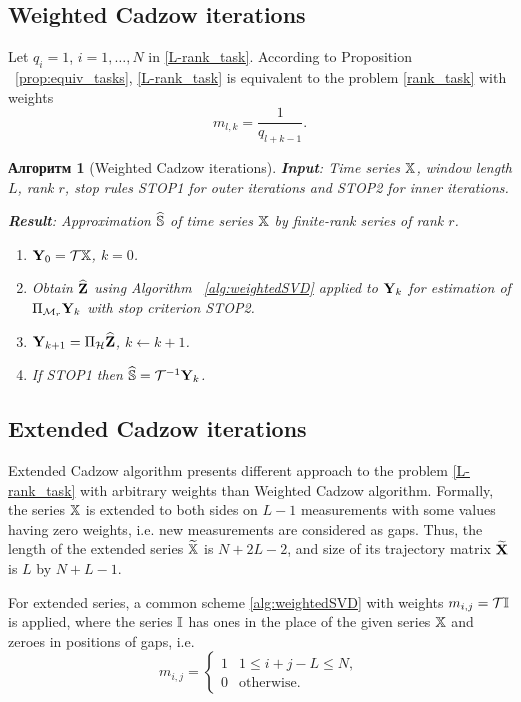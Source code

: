\documentclass[12pt,a4paper,fleqn,leqno]{article}
\newtheorem{algorithm}{Алгоритм}
\begin{document}
\subsection{Weighted Cadzow iterations}

Let $q_{i}=1$, $i = 1, \ldots, N$ in \eqref{L-rank_task}. According to Proposition ~\ref{prop:equiv_tasks},  \eqref{L-rank_task} is equivalent to the problem \eqref{rank_task} with weights
\begin{equation}
\label{Mw}
   m_{l, k} = \frac{1}{q_{l + k - 1}}.
\end{equation}

\begin{algorithm}[Weighted Cadzow iterations]\label{alg:WCIt}
\textbf{Input}: Time series $\mathbb{X}$, window length $L$, rank $r$,
stop rules STOP1 for outer iterations and STOP2 for inner iterations.

\textbf{Result}:
Approximation $\widehat{\mathbb{S}}$ of time series $\mathbb{X}$ by finite-rank series of rank $r$.

\begin{enumerate}
\item
$\mathbf{Y}_0 = \mathcal{T} \mathbb{X}$, $k=0$.
\item
Obtain $\widehat{\mathbf{Z}}$ using Algorithm ~\ref{alg:weightedSVD} applied to $\mathbf{Y}_k$ for estimation of $\Pi_{\mathcal{M}_r} \mathbf{Y}_{k}$ with stop criterion STOP2.
\item
$\mathbf{Y}_{k+1} = \Pi_{\mathcal{H}}  \widehat{\mathbf{Z}}$, $k\leftarrow k+1$.
\item
If STOP1 then $\widehat{\mathbb{S}} = \mathcal{T}^{-1} \mathbf{Y}_k$.
\end{enumerate}
\end{algorithm}

\subsection{Extended Cadzow iterations}
Extended Cadzow algorithm presents different approach to the problem \eqref{L-rank_task} with arbitrary weights than Weighted Cadzow algorithm.
Formally, the series $\mathbb{X}$ is extended to both sides on $L-1$ measurements with some values having zero weights, i.e. new measurements are considered as gaps.
Thus, the length of the extended series $\widetilde{\mathbb{X}}$ is $N+2L-2$, and size of its trajectory matrix $\widetilde{\mathbf{X}}$ is $L$ by $N+L-1$.

For extended series, a common scheme \ref{alg:weightedSVD} with weights $m_{i,j}=\mathcal{T} \mathbb{I}$ is applied, where the series $\mathbb{I}$ has ones in the place of the given series $\mathbb{X}$ and zeroes in positions of gaps, i.e.
\begin{equation*}
m_{i,j} = \begin{cases}
1 & 1 \le i+j-L \le N, \\
0 & \text{otherwise.}
\end{cases}
\end{equation*}
\end{document}
